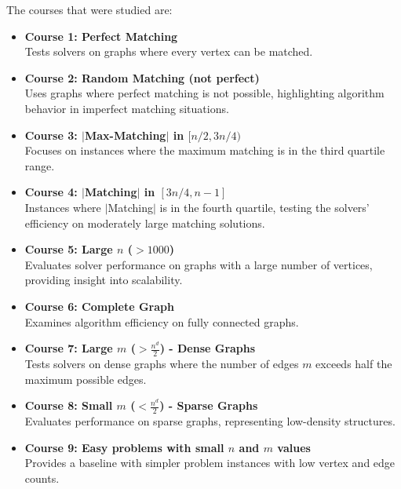 The courses that were studied are:
\begin{itemize}
    \item \textbf{Course 1: Perfect Matching} \\
    Tests solvers on graphs where every vertex can be matched.
    \item \textbf{Course 2: Random Matching (not perfect)} \\
    Uses graphs where perfect matching is not possible, highlighting algorithm behavior in imperfect matching situations.
    \item \textbf{Course 3: $\vert$Max-Matching$\vert$ in $[n/2,3n/4)$} \\
    Focuses on instances where the maximum matching is in the third quartile range.
    \item \textbf{Course 4: $\vert$Matching$\vert$ in $[3n/4, n-1]$} \\
    Instances where $\vert$Matching$\vert$ is in the fourth quartile, testing the solvers' efficiency on moderately large matching solutions.
    \item \textbf{Course 5: Large $n$ ($>1000$)} \\
    Evaluates solver performance on graphs with a large number of vertices, providing insight into scalability.
    \item \textbf{Course 6: Complete Graph} \\
    Examines algorithm efficiency on fully connected graphs.
    \item \textbf{Course 7: Large $m$ ($> \frac{n^d}{2}$) - Dense Graphs} \\
    Tests solvers on dense graphs where the number of edges $m$ exceeds half the maximum possible edges.
    \item \textbf{Course 8: Small $m$ ($< \frac{n^d}{2}$) - Sparse Graphs} \\
    Evaluates performance on sparse graphs, representing low-density structures.
    \item \textbf{Course 9: Easy problems with small $n$ and $m$ values} \\
    Provides a baseline with simpler problem instances with low vertex and edge counts.
\end{itemize}

